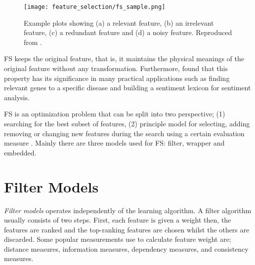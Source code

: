 \begin{figure}
  \texttt{[image: feature\_selection/fs\_sample.png]}
  \caption{Example plots showing (a) a relevant feature, (b) an irrelevant feature, (c) a redundant feature and (d) a noisy feature. Reproduced from \citet{sammut2017encyclopedia}.}
  \label{fig:fs_sample}
\end{figure}

FS keeps the original feature, that is, it maintains the physical meanings of the original feature without any transformation. Furthermore, \citet{masaeli2010transformation} found that this property has its significance in many practical applications such as finding relevant genes to a specific disease and building a sentiment lexicon for sentiment analysis.

FS is an optimization problem that can be split into two perspective; (1) searching for the best subset of features, (2) principle model for selecting, adding removing or changing new features during the search using a certain evaluation measure \citep{zhao2010advancing}. Mainly there are three models used for FS: filter, wrapper and embedded.

\section{Filter Models}\label{sec:fs_filter}
\textit{Filter models} operates independently of the learning algorithm. A filter algorithm usually consists of two steps. First, each feature is given a weight then, the features are ranked and the top-ranking features are chosen whilst the others are discarded. Some popular measurements use to calculate feature weight are; distance measures, information measures, dependency measures, and consistency measures.

